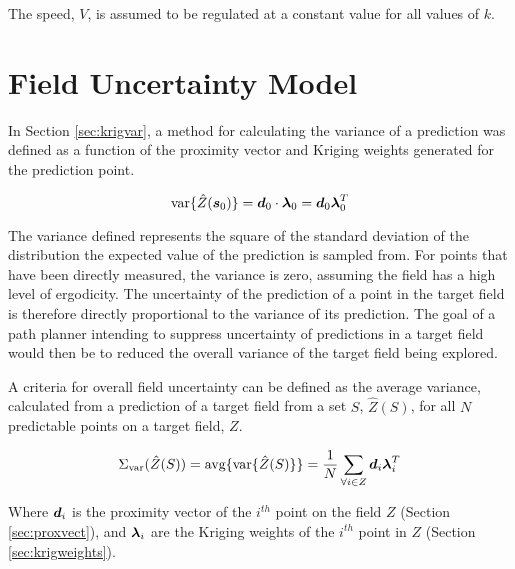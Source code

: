 The speed, $V$, is assumed to be regulated at a constant value for all values of $k$.

\section{Field Uncertainty Model} \label{sec:fielduncert}
In Section \ref{sec:krigvar}, a method for calculating the variance of a prediction was defined as a function of the proximity vector and Kriging weights generated for the prediction point.

\begin{equation}
    \text{var}\{\hat{Z}({\it{\boldsymbol{s}}}_0)\} = {\it{\boldsymbol{d}}}_0 \cdot {\it{\boldsymbol{\lambda}}}_0 = {\it{\boldsymbol{d}}}_0 {\it{\boldsymbol{\lambda}}}_0^T
\end{equation}

The variance defined represents the square of the standard deviation of the distribution the expected value of the prediction is sampled from. For points that have been directly measured, the variance is zero, assuming the field has a high level of ergodicity. The uncertainty of the prediction of a point in the target field is therefore directly proportional to the variance of its prediction. The goal of a path planner intending to suppress uncertainty of predictions in a target field would then be to reduced the overall variance of the target field being explored.

A criteria for overall field uncertainty can be defined as the average variance, calculated from a prediction of a target field from a set $S$, $\hat{Z}(S)$, for all $N$ predictable points on a target field, $Z$.

\begin{equation}
	\Sigma_{\text{var}}(\hat{Z}(S)) = \text{avg}\{{\text{var}\{\hat{Z}(S)\}}\} = \frac{1}{N}\sum_{\forall i \in Z} {\it{\boldsymbol{d}}}_i {\it{\boldsymbol{\lambda}}}_i^T
	\label{eq:fielduncert}
\end{equation}

Where ${\it{\boldsymbol{d}}}_i$ is the proximity vector of the $i^{th}$ point on the field $Z$ (Section \ref{sec:proxvect}), and ${\it{\boldsymbol{\lambda}}}_i$ are the Kriging weights of the $i^{th}$ point in $Z$ (Section \ref{sec:krigweights}).
